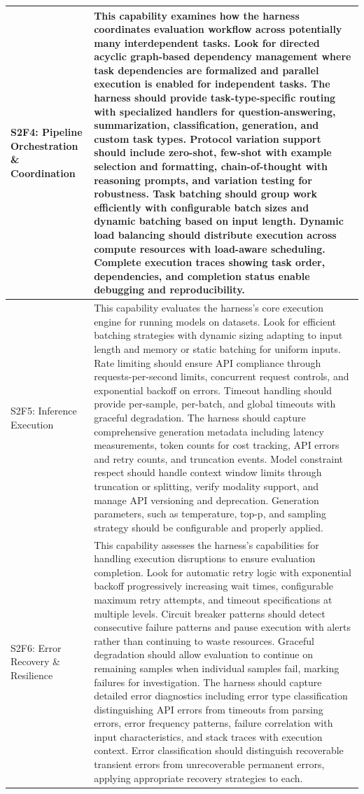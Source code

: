 \begin{longtable}{>{\raggedright\arraybackslash}p{3cm}|>{\raggedright\arraybackslash}p{16cm}}
S2F4: Pipeline Orchestration \& Coordination & This capability examines how the harness coordinates evaluation workflow across potentially many interdependent tasks. Look for directed acyclic graph-based dependency management where task dependencies are formalized and parallel execution is enabled for independent tasks. The harness should provide task-type-specific routing with specialized handlers for question-answering, summarization, classification, generation, and custom task types. Protocol variation support should include zero-shot, few-shot with example selection and formatting, chain-of-thought with reasoning prompts, and variation testing for robustness. Task batching should group work efficiently with configurable batch sizes and dynamic batching based on input length. Dynamic load balancing should distribute execution across compute resources with load-aware scheduling. Complete execution traces showing task order, dependencies, and completion status enable debugging and reproducibility. \\
\hline

S2F5: Inference Execution & This capability evaluates the harness's core execution engine for running models on datasets. Look for efficient batching strategies with dynamic sizing adapting to input length and memory or static batching for uniform inputs. Rate limiting should ensure API compliance through requests-per-second limits, concurrent request controls, and exponential backoff on errors. Timeout handling should provide per-sample, per-batch, and global timeouts with graceful degradation. The harness should capture comprehensive generation metadata including latency measurements, token counts for cost tracking, API errors and retry counts, and truncation events. Model constraint respect should handle context window limits through truncation or splitting, verify modality support, and manage API versioning and deprecation. Generation parameters, such as temperature, top-p, and sampling strategy should be configurable and properly applied. \\
\hline

S2F6: Error Recovery \& Resilience & This capability assesses the harness's capabilities for handling execution disruptions to ensure evaluation completion. Look for automatic retry logic with exponential backoff progressively increasing wait times, configurable maximum retry attempts, and timeout specifications at multiple levels. Circuit breaker patterns should detect consecutive failure patterns and pause execution with alerts rather than continuing to waste resources. Graceful degradation should allow evaluation to continue on remaining samples when individual samples fail, marking failures for investigation. The harness should capture detailed error diagnostics including error type classification distinguishing API errors from timeouts from parsing errors, error frequency patterns, failure correlation with input characteristics, and stack traces with execution context. Error classification should distinguish recoverable transient errors from unrecoverable permanent errors, applying appropriate recovery strategies to each. \\
\hline


\end{longtable}
